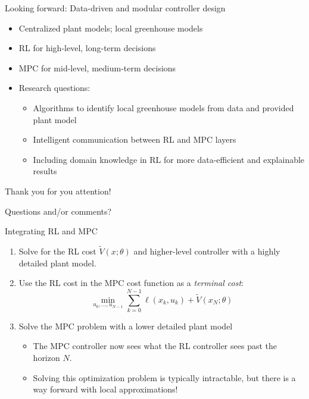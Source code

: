 \documentclass[xcolor=dvipsnames,aspectratio=169]{beamer}
\begin{document}
\begin{frame}{Looking forward: Data-driven and modular controller design}
	\begin{itemize}
		\item Centralized plant models; local greenhouse models
		\pause
		\item RL for high-level, long-term decisions
		\pause
		\item MPC for mid-level, medium-term decisions
		\pause
		\item Research questions:
		\begin{itemize}
			\pause
			\item Algorithms to identify local greenhouse models from data and 
			provided plant model
			\pause
			\item Intelligent communication between RL and MPC layers
			\pause
			\item Including domain knowledge in RL for more data-efficient and 
			explainable results
		\end{itemize}
	\end{itemize}

	\pause
	\bigskip

	\begin{center}
		Thank you for you attention!
		
		\bigskip
		
		Questions and/or comments?
	\end{center}
\end{frame}

\begin{frame}[noframenumbering]{Integrating RL and MPC}
	\begin{enumerate}
		\item Solve for the RL cost $\tilde{V}(x;\theta)$ and higher-level 
		controller with a highly detailed plant model.
		\pause
		\item Use the RL cost in the MPC cost function as a \textit{terminal 
			cost}: 
		\begin{equation*}
			\min_{u_0,\dots,u_{N-1}} \sum_{k=0}^{N-1} \ell(x_k,u_k) + 
			\tilde{V}(x_N;\theta)
		\end{equation*}
		\item Solve the MPC problem with a lower detailed plant model
		\begin{itemize}
			\pause
			\item The MPC controller now sees what the RL controller sees past 
			the horizon $N$. 
			\pause
			\item Solving this optimization problem is typically intractable, 
			but there is a way forward with local approximations!
		\end{itemize} 
	\end{enumerate}
\end{frame}
\end{document}
